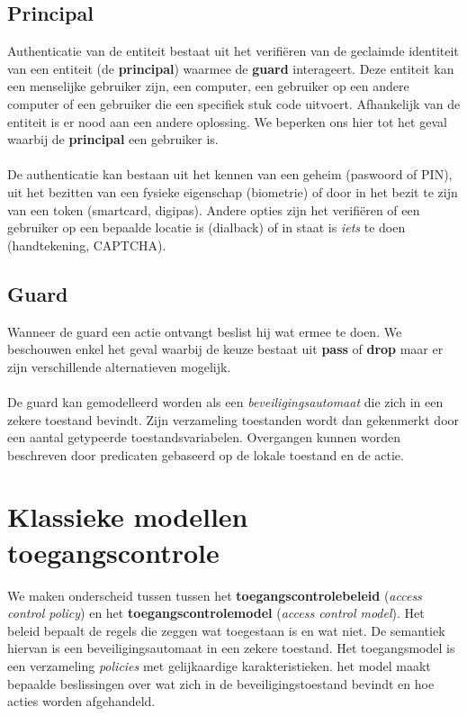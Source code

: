 \documentclass[../main.tex]{subfiles}
\begin{document}
\subsection{Principal}
Authenticatie van de entiteit bestaat uit het verifi\"eren van de geclaimde identiteit van een entiteit (de \textbf{principal}) waarmee de \textbf{guard} interageert. Deze entiteit kan een menselijke gebruiker zijn, een computer, een gebruiker op een andere computer of een gebruiker die een specifiek stuk code uitvoert. Afhankelijk van de entiteit is er nood aan een andere oplossing. We beperken ons hier tot het geval waarbij de \textbf{principal} een gebruiker is.
\\\\
De authenticatie kan bestaan uit het kennen van een geheim (paswoord of PIN), uit het bezitten van een fysieke eigenschap (biometrie) of door in het bezit te zijn van een token (smartcard, digipas). Andere opties zijn het verifi\"eren of een gebruiker op een bepaalde locatie is (dialback) of in staat is \textit{iets} te doen (handtekening, CAPTCHA).

\subsection{Guard}
Wanneer de guard een actie ontvangt beslist hij wat ermee te doen. We beschouwen enkel het geval waarbij de keuze bestaat uit \textbf{pass} of \textbf{drop} maar er zijn verschillende alternatieven mogelijk. 
\\\\
De guard kan gemodelleerd worden als een \textit{beveiligingsautomaat} die zich in een zekere toestand bevindt. Zijn verzameling toestanden wordt dan gekenmerkt door een aantal getypeerde toestandsvariabelen. Overgangen kunnen worden beschreven door predicaten gebaseerd op de lokale toestand en de actie.


\section{Klassieke modellen toegangscontrole}
We maken onderscheid tussen tussen het \textbf{toegangscontrolebeleid} (\textit{access control policy}) en het \textbf{toegangscontrolemodel} (\textit{access control model}). Het beleid bepaalt de regels die zeggen wat toegestaan is en wat niet. De semantiek hiervan is een beveiligingsautomaat in een zekere toestand. Het toegangsmodel is een verzameling \textit{policies} met gelijkaardige karakteristieken. het model maakt bepaalde beslissingen over wat zich in de beveiligingstoestand bevindt en hoe acties worden afgehandeld. 
\end{document}
